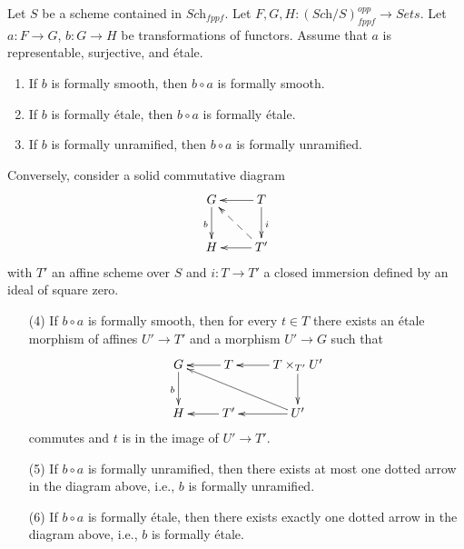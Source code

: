 \begin{lemma}
\label{lemma-etale-on-top}
Let $S$ be a scheme contained in $\textit{Sch}_{fppf}$.
Let $F, G, H : (\textit{Sch}/S)_{fppf}^{opp} \to \textit{Sets}$.
Let $a : F \to G$, $b : G \to H$ be transformations of functors.
Assume that $a$ is representable, surjective, and \'etale.
\begin{enumerate}
\item If $b$ is formally smooth, then $b \circ a$ is formally smooth.
\item If $b$ is formally \'etale, then $b \circ a$ is formally \'etale.
\item If $b$ is formally unramified, then $b \circ a$ is formally unramified.
\end{enumerate}
Conversely, consider a solid commutative diagram
$$
\xymatrix{
G \ar[d]_b & T \ar[d]^i \ar[l] \\
H & T' \ar[l] \ar@{-->}[lu]
}
$$
with $T'$ an affine scheme over $S$
and $i : T \to T'$ a closed immersion defined by an ideal of square zero.
\begin{enumerate}
\item[(4)] If $b \circ a$ is formally smooth, then for every $t \in T$
there exists an \'etale morphism of affines $U' \to T'$ and a morphism
$U' \to G$ such that
$$
\xymatrix{
G \ar[d]_b & T \ar[l] & T \times_{T'} U' \ar[d] \ar[l]\\
H & T' \ar[l] & U' \ar[llu] \ar[l]
}
$$
commutes and $t$ is in the image of $U' \to T'$.
\item[(5)] If $b \circ a$ is formally unramified, then there exists at most
one dotted arrow in the diagram above, i.e., $b$ is formally unramified.
\item[(6)] If $b \circ a$ is formally \'etale, then there exists exactly one
dotted arrow in the diagram above, i.e., $b$ is formally \'etale.
\end{enumerate}
\end{lemma}

